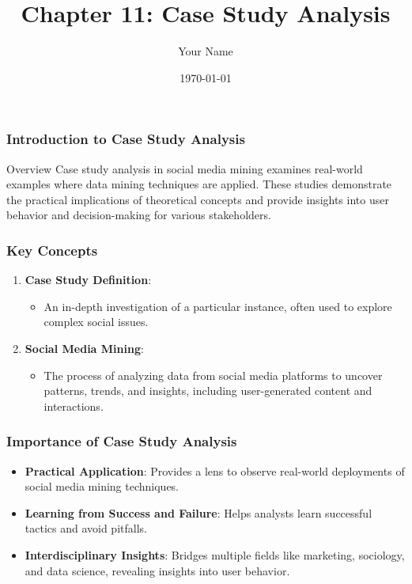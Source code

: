 \documentclass{beamer}
\title{Chapter 11: Case Study Analysis}
\author{Your Name}
\institute{Your Institution}
\date{\today}
\begin{document}
\frame{\titlepage}

\begin{frame}[fragile]
    \frametitle{Introduction to Case Study Analysis}
    \begin{block}{Overview}
        Case study analysis in social media mining examines real-world examples where data mining techniques are applied. These studies demonstrate the practical implications of theoretical concepts and provide insights into user behavior and decision-making for various stakeholders.
    \end{block}
\end{frame}

\begin{frame}[fragile]
    \frametitle{Key Concepts}
    \begin{enumerate}
        \item \textbf{Case Study Definition}:
            \begin{itemize}
                \item An in-depth investigation of a particular instance, often used to explore complex social issues.
            \end{itemize}
        \item \textbf{Social Media Mining}:
            \begin{itemize}
                \item The process of analyzing data from social media platforms to uncover patterns, trends, and insights, including user-generated content and interactions.
            \end{itemize}
    \end{enumerate}
\end{frame}

\begin{frame}[fragile]
    \frametitle{Importance of Case Study Analysis}
    \begin{itemize}
        \item \textbf{Practical Application}: Provides a lens to observe real-world deployments of social media mining techniques.
        \item \textbf{Learning from Success and Failure}: Helps analysts learn successful tactics and avoid pitfalls.
        \item \textbf{Interdisciplinary Insights}: Bridges multiple fields like marketing, sociology, and data science, revealing insights into user behavior.
    \end{itemize}
\end{frame}
\end{document}
